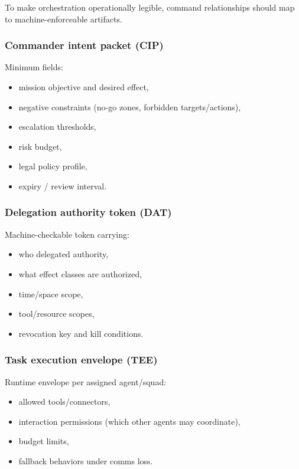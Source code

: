 \documentclass[
]{article}
\providecommand{\tightlist}{%
  \setlength{\itemsep}{0pt}\setlength{\parskip}{0pt}}
\begin{document}
To make orchestration operationally legible, command relationships
should map to machine-enforceable artifacts.

\hypertarget{commander-intent-packet-cip}{%
\subsubsection{Commander intent packet
(CIP)}\label{commander-intent-packet-cip}}

Minimum fields:

\begin{itemize}
\tightlist
\item
  mission objective and desired effect,
\item
  negative constraints (no-go zones, forbidden targets/actions),
\item
  escalation thresholds,
\item
  risk budget,
\item
  legal policy profile,
\item
  expiry / review interval.
\end{itemize}

\hypertarget{delegation-authority-token-dat}{%
\subsubsection{Delegation authority token
(DAT)}\label{delegation-authority-token-dat}}

Machine-checkable token carrying:

\begin{itemize}
\tightlist
\item
  who delegated authority,
\item
  what effect classes are authorized,
\item
  time/space scope,
\item
  tool/resource scopes,
\item
  revocation key and kill conditions.
\end{itemize}

\hypertarget{task-execution-envelope-tee}{%
\subsubsection{Task execution envelope
(TEE)}\label{task-execution-envelope-tee}}

Runtime envelope per assigned agent/squad:

\begin{itemize}
\tightlist
\item
  allowed tools/connectors,
\item
  interaction permissions (which other agents may coordinate),
\item
  budget limits,
\item
  fallback behaviors under comms loss.
\end{itemize}
\end{document}
